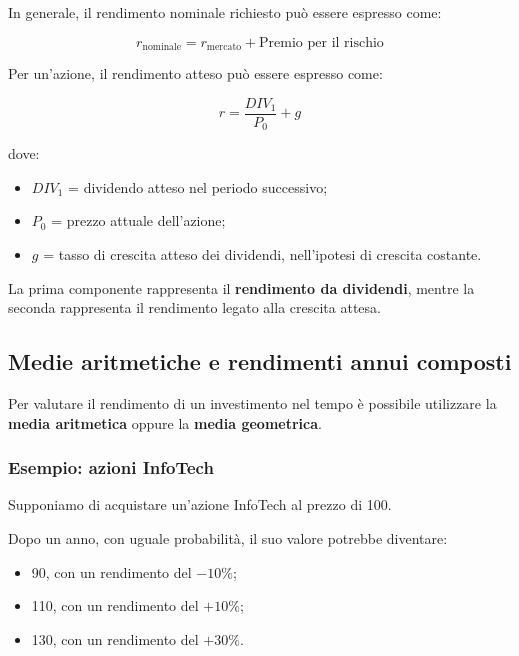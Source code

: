 \medskip

\noindent In generale, il rendimento nominale richiesto può essere espresso come:

\[
\boxed{
r_{\text{nominale}} =
r_{\text{mercato}} +
\text{Premio per il rischio}
}
\]

\noindent Per un'azione, il rendimento atteso può essere espresso come:

\[
\boxed{
r = \frac{DIV_1}{P_0}+g
}
\]

\noindent dove:

\begin{itemize}
    \item $DIV_1$ = dividendo atteso nel periodo successivo;
    \item $P_0$ = prezzo attuale dell'azione;
    \item $g$ = tasso di crescita atteso dei dividendi, nell'ipotesi di crescita costante.
\end{itemize}

\noindent La prima componente rappresenta il \textbf{rendimento da dividendi}, mentre la seconda rappresenta il rendimento legato alla crescita attesa.


\subsection{Medie aritmetiche e rendimenti annui composti}

\noindent Per valutare il rendimento di un investimento nel tempo è possibile utilizzare la \textbf{media aritmetica} oppure la \textbf{media geometrica}.

\subsubsection*{Esempio: azioni InfoTech}

\noindent Supponiamo di acquistare un'azione InfoTech al prezzo di 100.

\medskip

\noindent Dopo un anno, con uguale probabilità, il suo valore potrebbe diventare:

\begin{itemize}
    \item 90, con un rendimento del $-10\%$;
    \item 110, con un rendimento del $+10\%$;
    \item 130, con un rendimento del $+30\%$.
\end{itemize}

